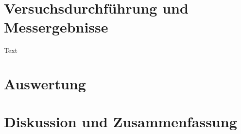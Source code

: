 \documentclass[11pt]{scrartcl}
\begin{document}
\section{Versuchsdurchführung und Messergebnisse}
\label{sec:versuchsdurchfuehrung-messergebnisse}

Text

\section{Auswertung}
\label{sec:auswertung}

\section{Diskussion und Zusammenfassung}
\label{sec:diskussion-zusammenfassung}

\printbibliography

\listoffigures

\listoftables
\end{document}

